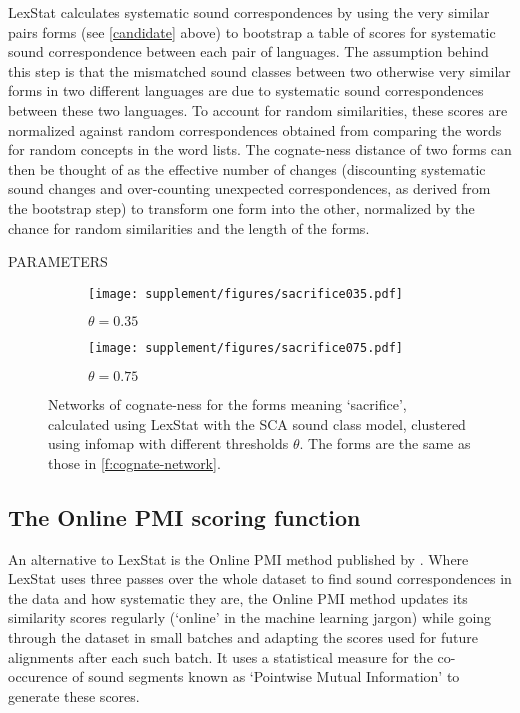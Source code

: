 \documentclass[a4paper,11pt,twocolumn]{scrartcl}
\begin{document}
LexStat \parencite{list2012lexstat} calculates systematic sound correspondences
by using the very similar pairs forms (see \cref{candidate} above) to bootstrap
a table of scores for systematic sound correspondence between each pair of
languages. The assumption behind this step is that the mismatched sound classes
between two otherwise very similar forms in two different languages are due to
systematic sound correspondences between these two languages. To account for
random similarities, these scores are normalized against random correspondences
obtained from comparing the words for random concepts in the word lists. The
cognate-ness distance of two forms can then be thought of as the effective
number of changes (discounting systematic sound changes and over-counting
unexpected correspondences, as derived from the bootstrap step) to transform one
form into the other, normalized by the chance for random similarities and the
length of the forms.

PARAMETERS


\begin{figure}
  \begin{subfigure}[b]{0.5\textwidth}
    \texttt{[image: supplement/figures/sacrifice035.pdf]} %
    \caption{$\theta = 0.35$}
    \label{f:theta035}
  \end{subfigure}
  \begin{subfigure}[b]{0.5\textwidth}
    \texttt{[image: supplement/figures/sacrifice075.pdf]} %
    \caption{$\theta = 0.75$}
    \label{f:theta075}
  \end{subfigure}
  \caption{Networks of cognate-ness for the forms meaning ‘sacrifice’, calculated using
    LexStat with the SCA sound class model, clustered using infomap with different thresholds $\theta$. The forms are the same as those in \cref{f:cognate-network}.}
  \label{f:infomap}
\end{figure}


\subsection{The Online PMI scoring function}
\label{onlinepmi}

An alternative to LexStat is the Online PMI method published by
\textcite{rama2017fast}. Where LexStat uses three passes over the whole dataset
to find sound correspondences in the data and how systematic they are, the
Online PMI method updates its similarity scores regularly (‘online’ in the
machine learning jargon) while going through the dataset in small batches and
adapting the scores used for future alignments after each such batch. It uses a
statistical measure for the co-occurence of sound segments known as ‘Pointwise
Mutual Information’ to generate these scores.
\end{document}
